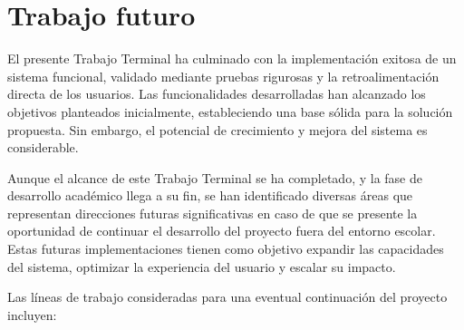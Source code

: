 \chapter{Trabajo futuro}

El presente Trabajo Terminal ha culminado con la implementación exitosa de un sistema funcional, validado mediante pruebas rigurosas y la retroalimentación directa de los usuarios. Las funcionalidades desarrolladas han alcanzado los objetivos planteados inicialmente, estableciendo una base sólida para la solución propuesta. Sin embargo, el potencial de crecimiento y mejora del sistema es considerable.

Aunque el alcance de este Trabajo Terminal se ha completado, y la fase de desarrollo académico llega a su fin, se han identificado diversas áreas que representan direcciones futuras significativas en caso de que se presente la oportunidad de continuar el desarrollo del proyecto fuera del entorno escolar. Estas futuras implementaciones tienen como objetivo expandir las capacidades del sistema, optimizar la experiencia del usuario y escalar su impacto.

Las líneas de trabajo consideradas para una eventual continuación del proyecto incluyen:

